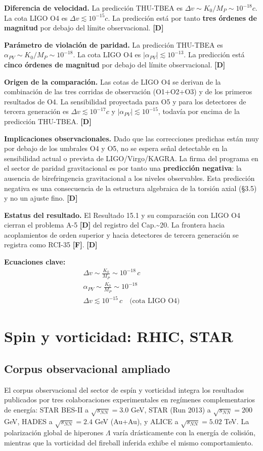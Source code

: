 ﻿\documentclass[11pt,letterpaper]{article}
\begin{document}
\textbf{Diferencia de velocidad.} La predicción THU-TBEA es $\Delta v \sim K_0/M_P \sim 10^{-18}c$. La cota LIGO O4 es $\Delta v \lesssim 10^{-15}c$. La predicción está por tanto \textbf{tres órdenes de magnitud} por debajo del límite observacional. \textbf{[D]}

\textbf{Parámetro de violación de paridad.} La predicción THU-TBEA es $\alpha_{PV} \sim K_0/M_P \sim 10^{-18}$. La cota LIGO O4 es $|\alpha_{PV}| \lesssim 10^{-13}$. La predicción está \textbf{cinco órdenes de magnitud} por debajo del límite observacional. \textbf{[D]}

\textbf{Origen de la comparación.} Las cotas de LIGO O4 se derivan de la combinación de las tres corridas de observación (O1+O2+O3) y de los primeros resultados de O4. La sensibilidad proyectada para O5 y para los detectores de tercera generación es $\Delta v \lesssim 10^{-17}c$ y $|\alpha_{PV}| \lesssim 10^{-15}$, todavía por encima de la predicción THU-TBEA. \textbf{[D]}

\textbf{Implicaciones observacionales.} Dado que las correcciones predichas están muy por debajo de los umbrales O4 y O5, no se espera señal detectable en la sensibilidad actual o prevista de LIGO/Virgo/KAGRA. La firma del programa en el sector de paridad gravitacional es por tanto una \textbf{predicción negativa}: la ausencia de birefringencia gravitacional a los niveles observables. Esta predicción negativa es una consecuencia de la estructura algebraica de la torsión axial (§3.5) y no un ajuste fino. \textbf{[D]}

\textbf{Estatus del resultado.} El Resultado 15.1 y su comparación con LIGO O4 cierran el problema A-5 \textbf{[D]} del registro del Cap.\textasciitilde{}20. La frontera hacia acoplamientos de orden superior y hacia detectores de tercera generación se registra como RCI-35 \textbf{[F]}. \textbf{[D]}

\textbf{Ecuaciones clave:}
\begin{align*}
    \Delta v \sim \frac{K_0}{M_P} \sim 10^{-18}\,c \\
    \alpha_{PV} \sim \frac{K_0}{M_P} \sim 10^{-18} \\
    \Delta v \lesssim 10^{-15}\,c \quad \text{(cota LIGO O4)}
\end{align*}
\section{Spin y vorticidad: RHIC, STAR}
\subsection{Corpus observacional ampliado}
El corpus observacional del sector de espín y vorticidad integra los resultados publicados por tres colaboraciones experimentales en regímenes complementarios de energía: STAR BES-II a $\sqrt{s_{NN}} = 3.0$ GeV, STAR (Run 2013) a $\sqrt{s_{NN}} = 200$ GeV, HADES a $\sqrt{s_{NN}} = 2.4$ GeV (Au+Au), y ALICE a $\sqrt{s_{NN}} = 5.02$ TeV. La polarización global de hiperones $\Lambda$ varía drásticamente con la energía de colisión, mientras que la vorticidad del fireball inferida exhibe el mismo comportamiento.
\end{document}

